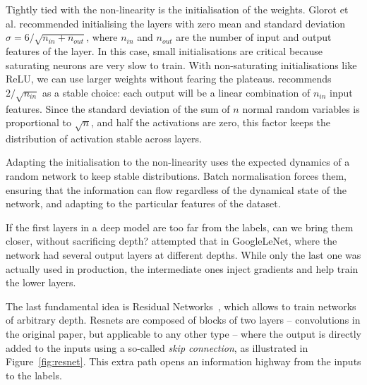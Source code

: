 Tightly tied  with the non-linearity is the initialisation of the weights.
Glorot et al. recommended initialising the layers with zero mean and standard deviation $\sigma=6/\sqrt{n_{in}+ n_{out}}$, where $n_{in}$ and $n_{out}$ are the number of input and output features of the layer.
In this case, small initialisations are critical because saturating neurons are very slow to train.
With non-saturating initialisations like ReLU, we can use larger weights without fearing the plateaus.
\citet{he} recommends $2/\sqrt{n_{in}}$ as a stable choice: each output will be a linear combination of $n_{in}$ input features.
Since the standard deviation of the sum of $n$ normal random variables is proportional to $\sqrt{n}$, and half the activations are zero, this factor keeps the distribution of activation stable across layers.

Adapting the initialisation  to the non-linearity uses the expected dynamics of a random network to keep stable distributions.
Batch normalisation forces them, ensuring that the information can flow regardless of the dynamical state of the network, and adapting to the particular features of the dataset.

If the first layers  in a deep model are
too far from the labels, can we bring them closer, without sacrificing depth?
\citet{googlenet} attempted that in GoogleLeNet, where the network had several output layers at different depths.
While only the last one was actually used in production, the intermediate ones inject gradients and help train the lower layers.

The last fundamental idea  is Residual Networks~\citep{resnet}, which allows to train networks of arbitrary depth.
Resnets are composed of blocks of two layers  -- convolutions in the original paper, but applicable to any other type -- where the output is directly added to the inputs using a so-called \emph{skip connection}, as illustrated in Figure~\ref{fig:resnet}.
This extra path opens an information highway from the inputs to the labels.

